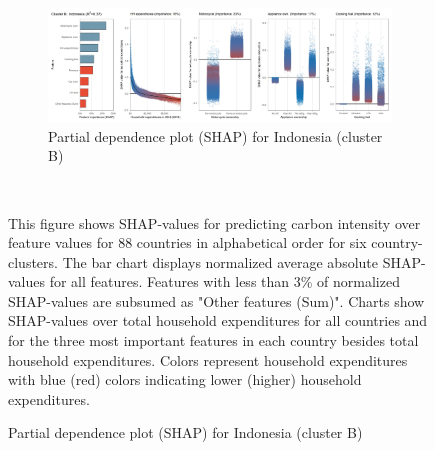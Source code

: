 \begin{figure}[ht!]
    \\
    \vspace{0.5cm}
   \begin{subfigure}[b]{\textwidth}
   \centering
         \caption{Partial dependence plot (SHAP) for Indonesia (cluster B)}
         \label{fig:5b_IDN}
         \includegraphics[width=\textwidth]{Figure 5b/Figure_5b_IDN}
     \end{subfigure}
    \\
    \vspace{0.5cm}
  
    \begin{subcaption2}
     This figure shows SHAP-values for predicting carbon intensity over feature values for 88 countries in alphabetical order for six country-clusters. The bar chart displays normalized average absolute SHAP-values for all features. Features with less than 3\% of normalized SHAP-values are subsumed as "Other features (Sum)". Charts show SHAP-values over total household expenditures for all countries and for the three most important features in each country besides total household expenditures. Colors represent household expenditures with blue (red) colors indicating lower (higher) household expenditures.
     \end{subcaption2}
\end{figure}

